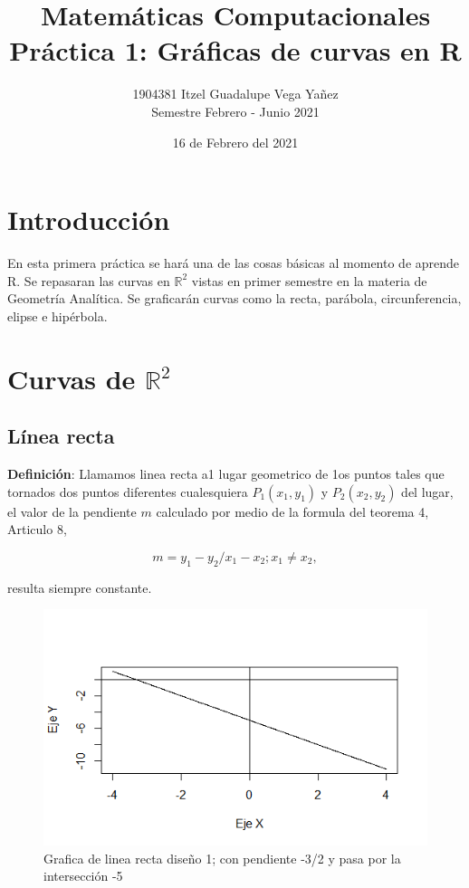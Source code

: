 \documentclass[12pt,a4paper]{article} %
\title{Matemáticas Computacionales \\ Práctica 1: Gráficas de curvas en R} %
\author{1904381 Itzel Guadalupe Vega Yañez \\ Semestre Febrero - Junio 2021} %
\date{16 de Febrero del 2021}
\begin{document}
\maketitle %

\section{Introducci\'{o}n}\label{sec:intro} %

En esta primera práctica se hará una de las cosas básicas al momento de aprende R. Se repasaran las curvas en $\mathbb{R}^2$ vistas en primer semestre en la materia de Geometría Analítica\citep{geometria}. Se graficarán curvas como la recta, parábola, circunferencia, elipse e hipérbola.

\section{Curvas de $\mathbb{R}^2$} \label{sec:curvas}

\subsection{Línea recta} \label{subsec:linearecta}

\textbf{Definici\'{o}n}: Llamamos linea recta a1 lugar geometrico de 1os puntos tales que tornados dos puntos diferentes cualesquiera $P_{1}(x_{1},y_{1})$ y $P_{2}(x_{2},y_{2})$ del lugar, el valor de la pendiente $m$ calculado por medio de la formula del teorema 4, Articulo 8,

\begin{equation}
m=y_{1}-y_{2}/x_{1}-x_{2}; x_{1} \neq x_{2},
\end{equation}

resulta siempre constante.
\begin{figure}
\centering
\includegraphics[scale=0.75]{Recta2.png}
\caption{Grafica de linea recta diseño 1; con pendiente -3/2 y pasa por la intersección -5}
\end{figure}
\end{document}
